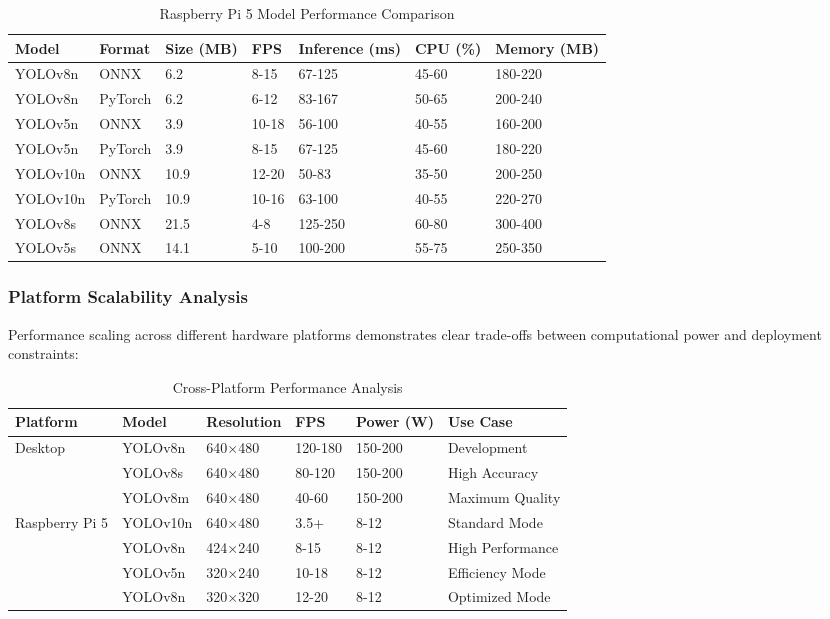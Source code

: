 \documentclass[11pt,a4paper]{article}
\begin{document}
\begin{table}[H]
\centering
\caption{Raspberry Pi 5 Model Performance Comparison}
\begin{tabular}{@{}lllllll@{}}
\toprule
\textbf{Model} & \textbf{Format} & \textbf{Size (MB)} & \textbf{FPS} & \textbf{Inference (ms)} & \textbf{CPU (\%)} & \textbf{Memory (MB)} \\
\midrule
YOLOv8n & ONNX & 6.2 & 8-15 & 67-125 & 45-60 & 180-220 \\
YOLOv8n & PyTorch & 6.2 & 6-12 & 83-167 & 50-65 & 200-240 \\
YOLOv5n & ONNX & 3.9 & 10-18 & 56-100 & 40-55 & 160-200 \\
YOLOv5n & PyTorch & 3.9 & 8-15 & 67-125 & 45-60 & 180-220 \\
YOLOv10n & ONNX & 10.9 & 12-20 & 50-83 & 35-50 & 200-250 \\
YOLOv10n & PyTorch & 10.9 & 10-16 & 63-100 & 40-55 & 220-270 \\
YOLOv8s & ONNX & 21.5 & 4-8 & 125-250 & 60-80 & 300-400 \\
YOLOv5s & ONNX & 14.1 & 5-10 & 100-200 & 55-75 & 250-350 \\
\bottomrule
\end{tabular}
\end{table}

\subsubsection{Platform Scalability Analysis}

Performance scaling across different hardware platforms demonstrates clear trade-offs between computational power and deployment constraints:

\begin{table}[H]
\centering
\caption{Cross-Platform Performance Analysis}
\begin{tabular}{@{}llllll@{}}
\toprule
\textbf{Platform} & \textbf{Model} & \textbf{Resolution} & \textbf{FPS} & \textbf{Power (W)} & \textbf{Use Case} \\
\midrule
\multirow{3}{*}{Desktop} & YOLOv8n & 640×480 & 120-180 & 150-200 & Development \\
 & YOLOv8s & 640×480 & 80-120 & 150-200 & High Accuracy \\
 & YOLOv8m & 640×480 & 40-60 & 150-200 & Maximum Quality \\
\midrule
\multirow{4}{*}{Raspberry Pi 5} & YOLOv10n & 640×480 & 3.5+ & 8-12 & Standard Mode \\
 & YOLOv8n & 424×240 & 8-15 & 8-12 & High Performance \\
 & YOLOv5n & 320×240 & 10-18 & 8-12 & Efficiency Mode \\
 & YOLOv8n & 320×320 & 12-20 & 8-12 & Optimized Mode \\
\bottomrule
\end{tabular}
\end{table}
\end{document}
